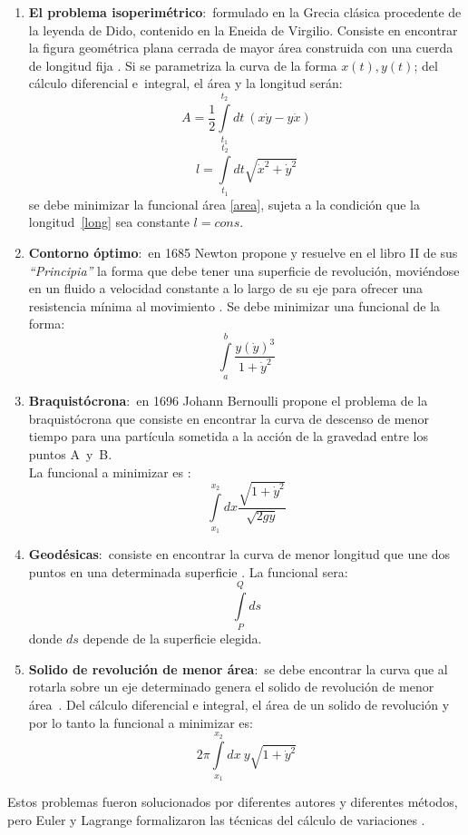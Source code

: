\documentclass[a4paper,12pt]{article}
\begin{document}
\begin{enumerate}
\item[\fbox{1.}] {\bf El problema isoperimétrico}:\ formulado en la Grecia clásica procedente de la leyenda de Dido, contenido en la Eneida de Virgilio. Consiste en encontrar la figura geométrica plana cerrada de mayor área construida con una cuerda de longitud fija \cite{funcional,ecudif,canada}. Si se parametriza la curva de la forma $x(t),y(t)$; del cálculo diferencial \mbox{e integral,} el área y la longitud serán:
\begin{equation}
A=\frac{1}{2}\int\limits_{t_1}^{t_2}dt\ (x\dot y -y\dot x)
\label{area}
\end{equation}
\begin{equation}
l=\int\limits_{t_1}^{t_2}dt\sqrt{\dot x^2+\dot y^2}
\label{long}
\end{equation}
se debe minimizar la funcional área \eqref{area}, sujeta a la condición que la \mbox{longitud \eqref{long}} sea constante $l=cons$.
\item[\fbox{2.}]  {\bf Contorno óptimo}:\ en 1685 Newton propone y resuelve en el libro II de sus \textit{``Principia''} la forma que debe tener una superficie de revolución, moviéndose en un fluido a velocidad constante a lo largo de su eje para ofrecer una resistencia mínima al movimiento \cite{canada}. Se debe minimizar una funcional de la forma:
\begin{equation}
\int\limits_{a}^{b}\frac{y(\dot y)^3}{1+\dot y^2}
\label{newton}
\end{equation}
\item[\fbox{3.}] {\bf Braquistócrona}:\ en 1696 Johann Bernoulli propone el problema de la braquistócrona que consiste en encontrar la curva de descenso de menor tiempo para una partícula sometida a la acción de la gravedad entre los puntos \mbox{A y B}. 
\\La funcional a minimizar es \cite{funcional,ecudif,canada}:
\begin{equation}
\int\limits_{x_1}^{x_2}dx\frac{\sqrt{1+\dot y^2}}{\sqrt{2gy}}
\label{braq}
\end{equation}
\item[\fbox{4.}] {\bf Geodésicas}:\ consiste en encontrar la curva de menor longitud que une dos puntos en una determinada superficie \cite{funcional,ecudif}. La funcional sera:
\begin{equation}
\int\limits_{P}^{Q}ds
\label{geo}
\end{equation}
donde $ds$ depende de la superficie elegida.
\item[\fbox{5.}] {\bf Solido de revolución de menor área}:\ se debe encontrar la curva que al rotarla sobre un eje determinado genera el solido de revolución de menor \mbox{área \cite{funcional,ecudif}.} Del cálculo diferencial e integral, el área de un solido de revolución y por lo tanto la funcional a minimizar es: 
\begin{equation}
2\pi\int\limits_{x_1}^{x_2}dx\ y\sqrt{1+\dot y^2}
\label{sol}
\end{equation}
\end{enumerate}
Estos problemas fueron solucionados por diferentes autores y diferentes métodos, pero Euler y Lagrange formalizaron las técnicas del cálculo de variaciones \cite{luzvar}.
\end{document}
